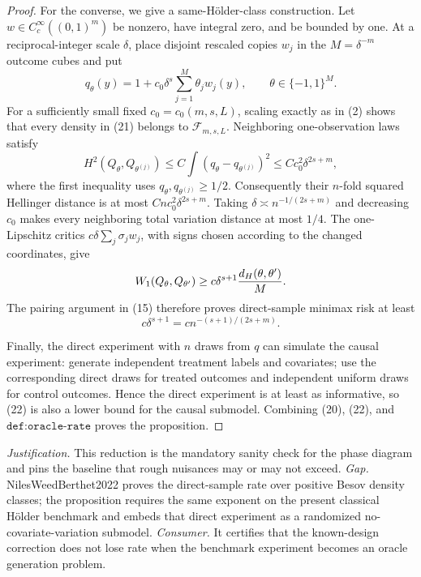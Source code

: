 \documentclass{article}
\begin{document}
\begin{proof}
For the converse, we give a same-Hölder-class construction.  Let \(w\in C_c^\infty((0,1)^m)\) be nonzero, have integral zero, and be bounded by one.  At a reciprocal-integer scale \(\delta\), place disjoint rescaled copies \(w_j\) in the \(M=\delta^{-m}\) outcome cubes and put
\[
 q_\theta(y)=1+c_0\delta^s\sum_{j=1}^M\theta_jw_j(y),
 \qquad \theta\in\{-1,1\}^M.
 \tag{21}
\]
For a sufficiently small fixed \(c_0=c_0(m,s,L)\), scaling exactly as in (2) shows that every density in (21) belongs to \(\mathcal F_{m,s,L}\).  Neighboring one-observation laws satisfy
\[
 H^2(Q_\theta,Q_{\theta^{(j)}})
 \leq C\int(q_\theta-q_{\theta^{(j)}})^2
 \leq Cc_0^2\delta^{2s+m},
\]
where the first inequality uses \(q_\theta,q_{\theta^{(j)}}\geq1/2\).  Consequently their \(n\)-fold squared Hellinger distance is at most \(Cnc_0^2\delta^{2s+m}\).  Taking \(\delta\asymp n^{-1/(2s+m)}\) and decreasing \(c_0\) makes every neighboring total variation distance at most \(1/4\).  The one-Lipschitz critics \(c\delta\sum_j\sigma_jw_j\), with signs chosen according to the changed coordinates, give
\[
 W_1(Q_\theta,Q_{\theta'})
 \geq c\delta^{s+1}{d_H(\theta,\theta')\over M}.
\]
The pairing argument in (15) therefore proves direct-sample minimax risk at least
\[
 c\delta^{s+1}=c n^{-(s+1)/(2s+m)}.
 \tag{22}
\]

Finally, the direct experiment with \(n\) draws from \(q\) can simulate the causal experiment: generate independent treatment labels and covariates; use the corresponding direct draws for treated outcomes and independent uniform draws for control outcomes.  Hence the direct experiment is at least as informative, so (22) is also a lower bound for the causal submodel.  Combining (20), (22), and \(\texttt{def:oracle-rate}\) proves the proposition.
\end{proof}
\par\smallskip\noindent \textit{Justification.} This reduction is the mandatory sanity check for the phase diagram and pins the baseline that rough nuisances may or may not exceed. \textit{Gap.} NilesWeedBerthet2022 proves the direct-sample rate over positive Besov density classes; the proposition requires the same exponent on the present classical Hölder benchmark and embeds that direct experiment as a randomized no-covariate-variation submodel. \textit{Consumer.} It certifies that the known-design correction does not lose rate when the benchmark experiment becomes an oracle generation problem.
\end{document}
